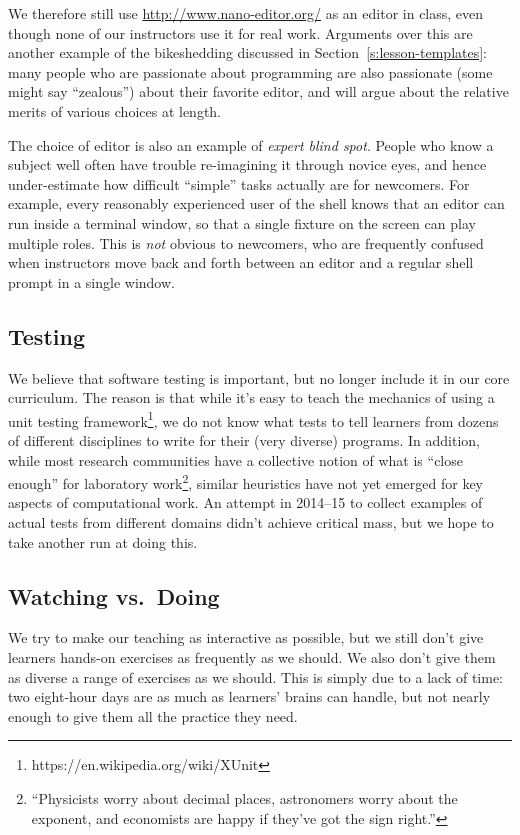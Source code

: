 \documentclass[10pt,a4paper,twocolumn]{article}
\begin{document}
We therefore still use \href{Nano}{http://www.nano-editor.org/} as an
editor in class, even though none of our instructors use it for real
work.  Arguments over this are another example of the bikeshedding
discussed in Section~\ref{s:lesson-templates}: many people who are
passionate about programming are also passionate (some might say
``zealous'') about their favorite editor, and will argue about the
relative merits of various choices at length.

The choice of editor is also an example of \emph{expert blind spot}.
People who know a subject well often have trouble re-imagining it
through novice eyes, and hence under-estimate how difficult ``simple''
tasks actually are for newcomers.  For example, every reasonably
experienced user of the shell knows that an editor can run inside a
terminal window, so that a single fixture on the screen can play
multiple roles.  This is \emph{not} obvious to newcomers, who are
frequently confused when instructors move back and forth between an
editor and a regular shell prompt in a single window.

\subsection{Testing}

We believe that software testing is important, but no longer include
it in our core curriculum.  The reason is that while it's easy to
teach the mechanics of using a unit testing
framework\footnote{https://en.wikipedia.org/wiki/XUnit}, we do not
know what tests to tell learners from dozens of different disciplines
to write for their (very diverse) programs.  In addition, while most
research communities have a collective notion of what is ``close
enough'' for laboratory work\footnote{``Physicists worry about
  decimal places, astronomers worry about the exponent, and economists
  are happy if they've got the sign right.''}, similar heuristics have
not yet emerged for key aspects of computational work.  An attempt in
2014--15 to collect examples of actual tests from different domains
didn't achieve critical mass, but we hope to take another run at doing
this.

\subsection{Watching vs.\ Doing}

We try to make our teaching as interactive as possible, but we still
don't give learners hands-on exercises as frequently as we should.  We
also don't give them as diverse a range of exercises as we should.
This is simply due to a lack of time: two eight-hour days are as much
as learners' brains can handle, but not nearly enough to give them all
the practice they need.
\end{document}
